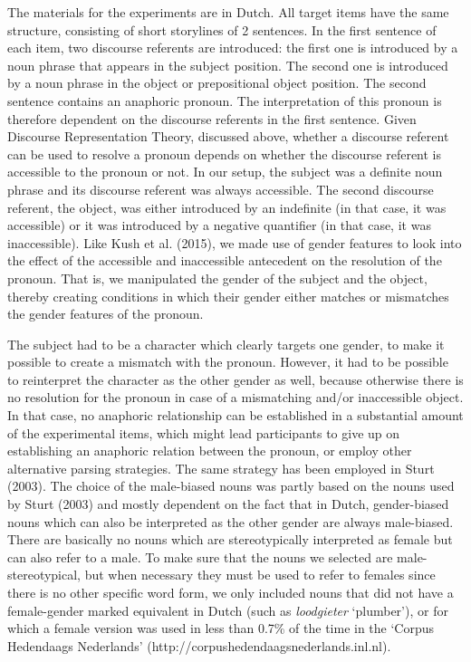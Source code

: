 \documentclass[11pt]{article} %
\begin{document}
The materials for the experiments are in Dutch. All target items have the same structure, consisting of short storylines of 2 sentences. In the first sentence of each item, two discourse referents are introduced: the first one is introduced by a noun phrase that appears in the subject position. The second one is introduced by a noun phrase in the object or prepositional object position. The second sentence contains an anaphoric pronoun. The interpretation of this pronoun is therefore dependent on the discourse referents in the first sentence. Given Discourse Representation Theory, discussed above, whether a discourse referent can be used to resolve a pronoun depends on whether the discourse referent is accessible to the pronoun or not. In our setup, the subject was a definite noun phrase and its discourse referent was always accessible. The second discourse referent, the object, was either introduced by an indefinite (in that case, it was accessible) or it was introduced by a negative quantifier (in that case, it was inaccessible). Like Kush et al. (2015), we made use of gender features to look into the effect of the accessible and inaccessible antecedent on the resolution of the pronoun. That is, we manipulated the gender of the subject and the object, thereby creating conditions in which their gender either matches or mismatches the gender features of the pronoun. 

The subject had to be a character which clearly targets one gender, to make it possible to create a mismatch with the pronoun. However, it had to be possible to reinterpret the character as the other gender as well, because otherwise there is no resolution for the pronoun in case of a mismatching and/or inaccessible object. In that case, no anaphoric relationship can be established in a substantial amount of the experimental items, which might lead participants to give up on establishing an anaphoric relation between the pronoun, or employ other alternative parsing strategies. The same strategy has been employed in Sturt (2003). The choice of the male-biased nouns was partly based on the nouns used by Sturt (2003) and mostly dependent on the fact that in Dutch, gender-biased nouns which can also be interpreted as the other gender are always male-biased. There are basically no nouns which are stereotypically interpreted as female but can also refer to a male. To make sure that the nouns we selected are male-stereotypical, but when necessary they must be used to refer to females since there is no other specific word form, we only included nouns that did not have a female-gender marked equivalent in Dutch (such as \textit{loodgieter} `plumber'), or for which a female version was used in less than 0.7\% of the time in the `Corpus Hedendaags Nederlands' (http://corpushedendaagsnederlands.inl.nl). 
\end{document}
